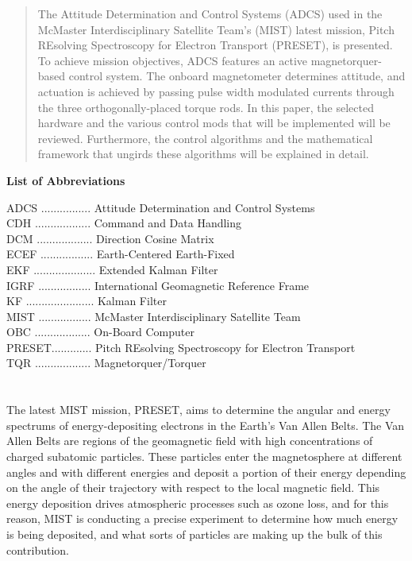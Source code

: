\documentclass{article}
\begin{document}
\begin{abstract}
    The Attitude Determination and Control Systems (ADCS) used in the McMaster Interdisciplinary Satellite Team's (MIST) latest mission, Pitch REsolving Spectroscopy for Electron Transport (PRESET), is presented. To achieve mission objectives, ADCS features an active magnetorquer-based control system. The onboard magnetometer determines attitude, and actuation is achieved by passing pulse width modulated currents through the three orthogonally-placed torque rods. In this paper, the selected hardware and the various control mods that will be implemented will be reviewed. Furthermore, the control algorithms and the mathematical framework that ungirds these algorithms will be explained in detail. 
\end{abstract}

\newpage

\tableofcontents

\newpage

\textbf{\large{List of Abbreviations}} 

\vspace{0.2cm}

 
\noindent ADCS ................ Attitude Determination and Control Systems \\
CDH .................. Command and Data Handling \\
DCM .................. Direction Cosine Matrix \\
ECEF ................. Earth-Centered Earth-Fixed \\
EKF .................... Extended Kalman Filter \\
IGRF ................. International Geomagnetic Reference Frame \\
KF ...................... Kalman Filter \\
MIST ................. McMaster Interdisciplinary Satellite Team \\
OBC .................. On-Board Computer \\
PRESET............. Pitch REsolving Spectroscopy for Electron Transport \\
TQR .................. Magnetorquer/Torquer \\

\newpage

\section{\color{black}{Introduction}}

The latest MIST mission, PRESET, aims to determine the angular and energy spectrums of energy-depositing electrons in the Earth's Van Allen Belts. The Van Allen Belts are regions of the geomagnetic field with high concentrations of charged subatomic particles. These particles enter the magnetosphere at different angles and with different energies and deposit a portion of their energy depending on the angle of their trajectory with respect to the local magnetic field. This energy deposition drives atmospheric processes such as ozone loss, and for this reason, MIST is conducting a precise experiment to determine how much energy is being deposited, and what sorts of particles are making up the bulk of this contribution. 
\end{document}
